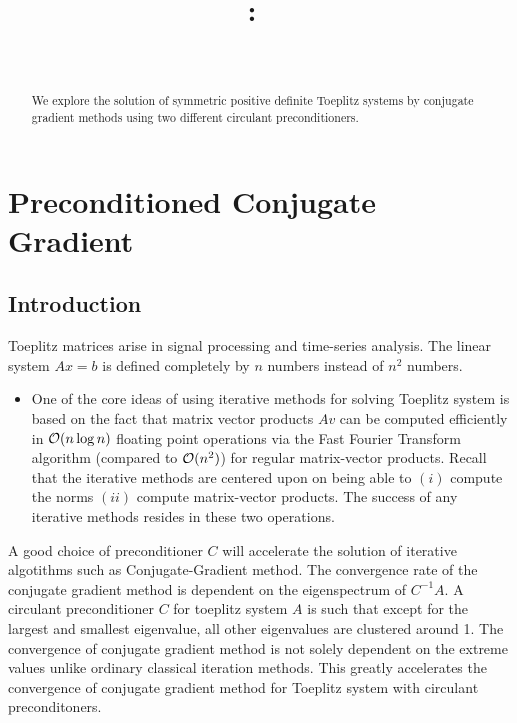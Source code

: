 \documentclass{article}
\title{
    \vspace{2in}
    \textmd{\textbf{\hmwkClass:\ \hmwkTitle}}\\
    \normalsize\vspace{0.1in}\small{\hmwkDueDate}\\
    \vspace{3in}
}
\author{\textbf{\Large\hmwkAuthorName}}
\date{}
\begin{document}
\maketitle
\thispagestyle{empty}

\pagebreak

\section{Preconditioned Conjugate Gradient}

\begin{abstract}
  We explore the solution of symmetric positive definite
  Toeplitz systems by conjugate gradient methods using two different
  circulant preconditioners.
\end{abstract}

\subsection{Introduction}

Toeplitz matrices arise in signal processing and time-series
analysis. The linear system $Ax =b$ is defined completely by $n$
numbers instead of $n^2$ numbers.

\begin{itemize}
  
\item One of the core ideas of using iterative methods for solving
  Toeplitz system is based on the fact that matrix vector products
  $Av$ can be computed efficiently in ${\cal{O}}(n \log n)$ floating
  point operations via the Fast Fourier Transform algorithm
  (compared to ${\cal{O}}(n^2)$) for regular matrix-vector
  products. Recall that the iterative methods are centered upon on
  being able to $(i)$ compute the norms $(ii)$ compute matrix-vector
  products. The success of any iterative methods resides in these
  two operations.
  
\end{itemize}

A good choice of preconditioner $C$ will accelerate the solution of
iterative algotithms such as Conjugate-Gradient method.  The
convergence rate of the conjugate gradient method is dependent on the
eigenspectrum of $C^{-1}A$. A circulant preconditioner $C$ for
toeplitz system $A$ is such that except for the largest and smallest
eigenvalue, all other eigenvalues are clustered around 1. The
convergence of conjugate gradient method is not solely dependent on
the extreme values unlike ordinary classical iteration methods. This
greatly accelerates the convergence of conjugate gradient method for
Toeplitz system with circulant preconditoners.
\end{document}
